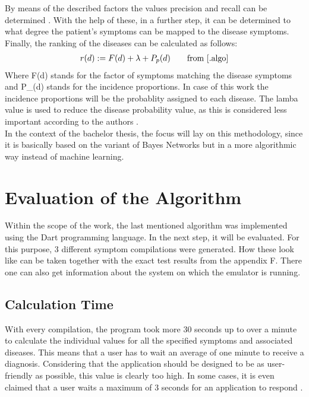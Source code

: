 \noindent
By means of the described factors the values precision and recall can be determined \cite[p. 9]{.algo}. With the help of these, in a further step, it can be determined to what degree the patient's symptoms can be mapped to the disease symptoms. Finally, the ranking of the diseases can be calculated as follows:
\begin{equation}
	  \begin{aligned}
		r(d) := F(d) + \lambda + P_p(d)\\
	 \end{aligned}\qquad\text{from \cite{.algo}}
\end{equation}
Where F(d) stands for the factor of symptoms matching the disease symptoms and P\_(d) stands for the incidence proportions. In case of this work the incidence proportions will be the probablity assigned to each disease. The lamba value is used to reduce the disease probability value, as this is considered less important according to the authors \cite[p. 10]{.algo}. 
\newline \\
In the context of the bachelor thesis, the focus will lay on this methodology, since it is basically based on the variant of Bayes Networks but in a more algorithmic way instead of machine learning.


\section{Evaluation of the Algorithm}
Within the scope of the work, the last mentioned algorithm was implemented using the Dart programming language. In the next step, it will be evaluated. For this purpose, 3 different symptom compilations were generated. How these look like can be taken together with the exact test results from the appendix F.  There one can also get information about the system on which the emulator is running.

\subsection{Calculation Time}
With every compilation, the program took more 30 seconds up to over a minute to calculate the individual values for all the specified symptoms and associated diseases. This means that a user has to wait an average of one minute to receive a diagnosis. Considering that the application should be designed to be as user-friendly as possible, this value is clearly too high. In some cases, it is even claimed that a user waits a maximum of 3 seconds for an application to respond \cite{.3sek}.

